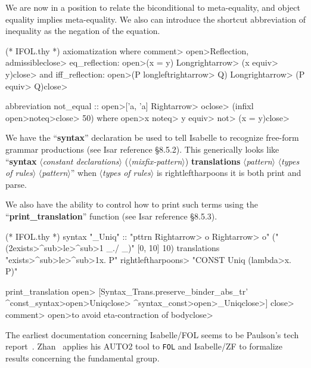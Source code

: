 \begin{node}[Formulas]
\begin{node}\label{isabelle:fol-0005}%
We are now in a position to relate the biconditional to meta-equality,
and object equality implies meta-equality. We also can introduce the
shortcut abbreviation of inequality as the negation of the equation.
\begin{Isabelle}
(* IFOL.thy *)
axiomatization where  \<comment> \<open>Reflection, admissible\<close>
  eq_reflection: \<open>(x = y) \<Longrightarrow> (x \<equiv> y)\<close> and
  iff_reflection: \<open>(P \<longleftrightarrow> Q) \<Longrightarrow> (P \<equiv> Q)\<close>

abbreviation not_equal :: \<open>['a, 'a] \<Rightarrow> o\<close>  (infixl \<open>\<noteq>\<close> 50)
  where \<open>x \<noteq> y \<equiv> \<not> (x = y)\<close>
\end{Isabelle}
\end{node}

\begin{node}\label{isabelle:fol-0009}%
We have the ``\textbf{syntax}'' declaration be used to tell Isabelle to
recognize free-form grammar productions (see Isar reference
\S8.5.2). This generically looks like 
``\textbf{syntax} $\langle$\textit{constant declarations\/}$\rangle$
($\langle$\textit{mixfix-pattern\/}$\rangle$)
\textbf{translations} $\langle$\textit{pattern\/}$\rangle$ $\langle$\textit{types of rules\/}$\rangle$ $\langle$\textit{pattern\/}$\rangle$''
when $\langle$\textit{types of rules\/}$\rangle$ is rightleftharpoons it
is both print and parse.

We also have the ability to control how to print such terms using the
``\textbf{print\_translation}'' function (see Isar reference \S8.5.3).
\begin{Isabelle}
(* IFOL.thy *)
syntax "_Uniq" :: "pttrn \<Rightarrow> o \<Rightarrow> o"  ("(2\<exists>\<^sub>\<le>\<^sub>1 _./ _)" [0, 10] 10)
translations "\<exists>\<^sub>\<le>\<^sub>1x. P" \<rightleftharpoons> "CONST Uniq (\<lambda>x. P)"

print_translation \<open>
 [Syntax_Trans.preserve_binder_abs_tr' \<^const_syntax>\<open>Uniq\<close> \<^syntax_const>\<open>_Uniq\<close>]
\<close> \<comment> \<open>to avoid eta-contraction of body\<close>
\end{Isabelle}
\end{node}
\end{node}

\begin{node}[References]\label{isabelle:fol-0002}%
The earliest documentation concerning Isabelle/FOL seems to be Paulson's
tech report~\cite{paulson1993object}. Zhan~\cite{Zhan2017formalization}
applies his AUTO2 tool to \texttt{FOL} and Isabelle/ZF to formalize
results concerning the fundamental group.
\end{node}